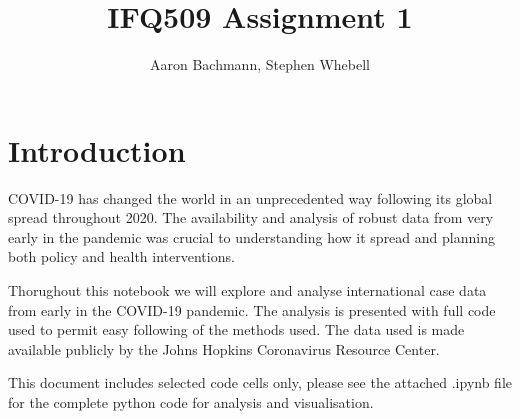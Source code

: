 \documentclass[8pt]{article}
\title{IFQ509 Assignment 1}
\author{Aaron Bachmann, Stephen Whebell}
\begin{document}
    
    \maketitle
    
    

    \section{Introduction}COVID-19 has changed the world in an unprecedented way following its global spread throughout 2020. The availability and analysis of robust data from very early in the pandemic was crucial to understanding how it spread and planning both policy and health interventions.


Thorughout this notebook we will explore and analyse international case data from early in the COVID-19 pandemic. The analysis is presented with full code used to permit easy following of the methods used. The data used is made available publicly by the Johns Hopkins Coronavirus Resource Center.


This document includes selected code cells only, please see the attached .ipynb file for the complete python code for analysis and visualisation.
\end{document}
